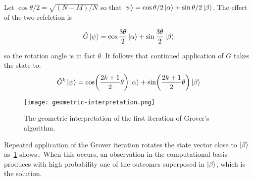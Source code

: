  Let $\cos\theta/2 = \sqrt{(N-M)/N}$ so that $\ket{\psi} = \cos\theta/2\ket{\alpha} + \sin\theta/2\ket{\beta}$.  The effect of the two refelction is
 
 \begin{equation*}
    \hat{G}\ket{\psi} = \cos\frac{3\theta}{2} \ket{\alpha} + \sin\frac{3\theta}{2} \ket{\beta}
\end{equation*}

so the rotation angle is in fact $\theta$. It follows that continued application of $G$ takes the state to:
\begin{equation*}
    \hat{G}^{k}\ket{\psi} = \cos\biggl(\frac{2k+1}{2}\theta\biggr) \ket{\alpha} + \sin\biggl(\frac{2k+1}{2}\theta\biggr) \ket{\beta}
\end{equation*}

\begin{figure}
\texttt{[image: geometric-interpretation.png]}
\centering
\caption{The geometric interpretation of the first iteration of Grover's algorithm.}
\label{fig:geometric-interpretation}
\end{figure}

Repeated application of the Grover iteration rotates the state vector close to $\ket{\beta}$ as~\ref{fig:geometric-interpretation} shows.. When this occurs, an observation in the computational basis produces with high probability one of the outcomes superposed in $\ket{\beta}$, which is the solution.

